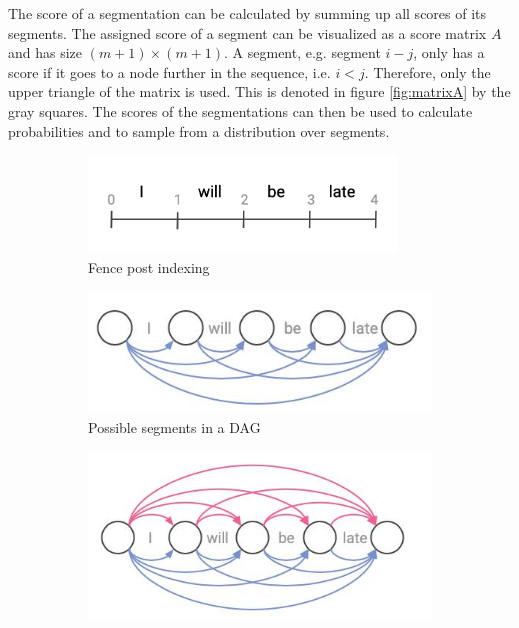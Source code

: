 The score of a segmentation can be calculated by summing up all scores of its segments.
The assigned score of a segment can be visualized as a score matrix $A$ and has size $(m+1) \times (m+1)$. 
A segment, e.g. segment $i-j$, only has a score if it goes to a node further in the sequence, i.e. $i < j$.
Therefore, only the upper triangle of the matrix is used. 
This is denoted in figure \ref{fig:matrixA} by the gray squares.
The scores of the segmentations can then be used to calculate probabilities and to sample from a distribution over segments.

\begin{figure}
    \centering
    \begin{subfigure}[b]{0.45\textwidth}
        \centering
        \includegraphics[width=0.9\textwidth]{figs/fencepost.png}
        \caption{Fence post indexing}
        \label{fig:fencepost}
    \end{subfigure}
    \hfill
    \begin{subfigure}[b]{0.45\textwidth}
        \centering
        \includegraphics[width=\textwidth]{figs/segmentation1.jpeg}
        \caption{Possible segments in a DAG}
        \label{fig:dag}
    \end{subfigure}
    \hfill
    \begin{subfigure}[b]{0.45\textwidth}
        \centering
        \includegraphics[width=\textwidth]{figs/segmentation2.jpeg}

\end{subfigure}
\end{figure}
